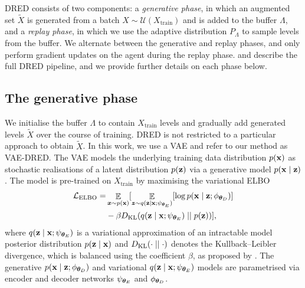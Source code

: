 
DRED consists of two components: a \textit{generative phase}, in which an augmented set $\tilde{X}$ is generated from a batch $X \sim \mathcal{U}(X_\text{train})$ and is added to the buffer $\Lambda$, and a \textit{replay phase}, in which we use the adaptive distribution $P_\Lambda$ to sample levels from the buffer. We alternate between the generative and replay phases, and only perform gradient updates on the agent during the replay phase.  and  describe the full DRED pipeline, and we provide further details on each phase below.
\subsection{The generative phase}
We initialise the buffer $\Lambda$ to contain $X_\text{train}$ levels and gradually add generated levels $\tilde{X}$ over the course of training. DRED is not restricted to a particular approach to obtain $\tilde{X}$. In this work, we use a VAE \citep{VAE, VAE-pmlr-v32-rezende14} and refer to our method as VAE-DRED. The VAE models the underlying training data distribution $p({\mathbf{x}})$ %
as stochastic realisations of a latent distribution $p({\mathbf{z}})$ via a generative model $p({\mathbf{x}} \mid {\mathbf{z}})$.
The model is pre-trained on $X_\text{train}$ by maximising the variational ELBO
\begin{equation} \label{c3:eq:ELBO}
\begin{split}
    \mathcal{L}_{\text{ELBO}} = & \mathop{\mathbb{E}}_{{\bm{x}}\sim p({\mathbf{x}})} [  \mathop{\mathbb{E}}_{{\bm{z}} \sim q({\mathbf{z}}|{\mathbf{x}}; \psi_{{\bm{\theta}}_E})}[\log p({\mathbf{x}} \mid {\mathbf{z}}; \phi_{{\bm{\theta}}_D})] \\
    & - \beta D_{\mathrm{KL}}(q({\mathbf{z}} \mid {\mathbf{x}};\psi_{{\bm{\theta}}_E})\mid\mid p({\mathbf{z}}))],
\end{split}
\end{equation}
where $q({\mathbf{z}} \mid {\mathbf{x}}; \psi_{{\bm{\theta}}_E})$ is a variational approximation of an intractable model posterior distribution $p({\mathbf{z}} \mid {\mathbf{x}})$ and $D_{\mathrm{KL}}(\cdot \mid\mid \cdot)$ denotes the Kullback--Leibler divergence, which is balanced using the coefficient $\beta$, as proposed by \citet{betaVAE}. 
The generative $p({\mathbf{x}} \mid {\mathbf{z}}; \phi_{{\bm{\theta}}_D})$ and variational $q({\mathbf{z}} \mid {\mathbf{x}} ; \psi_{{\bm{\theta}}_E})$ models are parametrised via encoder and decoder networks $\psi_{{\bm{\theta}}_E}$ and $\phi_{{\bm{\theta}}_D}$.%

